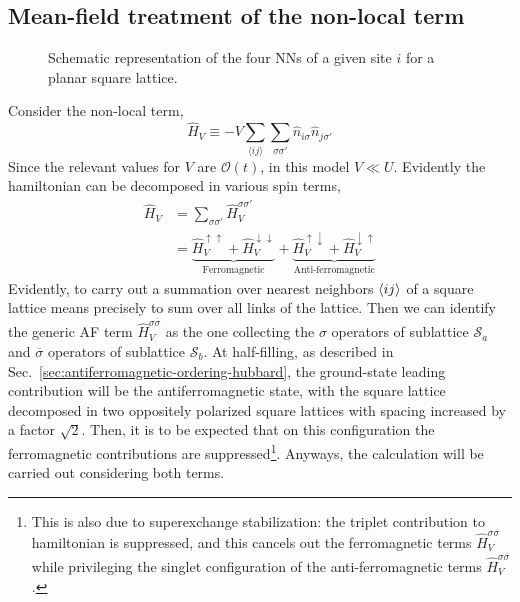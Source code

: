 \subsection{Mean-field treatment of the non-local term}

\begin{figure}
	\centering
	
	\caption{Schematic representation of the four NNs of a given site $i$ for a planar square lattice.}
	\label{fig:square-nearest-neighbors}
\end{figure}

Consider the non-local term,
\begin{equation}\label{eq:extended-hubbard-nonlocal-interaction}
	\hat H_V \equiv - V \sum_{\langle ij \rangle} \sum_{\sigma \sigma'} \hat n_{i\sigma} \hat n_{j\sigma'}
\end{equation}
{\color{tabred}Since the relevant values for $V$ are $\mathcal{O}(t)$, in this model $V \ll U$.} Evidently the hamiltonian can be decomposed in various spin terms,
\[
\begin{aligned}
	\hat H_V &= \sum_{\sigma \sigma'} \hat H_V^{\sigma\sigma'} \\
	&= \underbrace{
		\hat H_V^{\uparrow\uparrow} + \hat H_V^{\downarrow\downarrow}
	}_\text{Ferromagnetic} + \underbrace{
		\hat H_V^{\uparrow\downarrow} + \hat H_V^{\downarrow\uparrow}
	}_\text{Anti-ferromagnetic}
\end{aligned}
\]
Evidently, to carry out a summation over nearest neighbors $\ev{ij}$ of a square lattice means precisely to sum over all links of the lattice. Then we can identify the generic AF term $\hat H_V^{\sigma \overline{\sigma}}$ as the one collecting the $\sigma$ operators of sublattice $\mathcal{S}_a$ and $\overline{\sigma}$ operators of sublattice $\mathcal{S}_b$. At half-filling, as described in Sec.~\ref{sec:antiferromagnetic-ordering-hubbard}, the ground-state leading contribution will be the antiferromagnetic state, with the square lattice decomposed in two oppositely polarized square lattices with spacing increased by a factor $\sqrt{2}$. Then, it is to be expected that on this configuration the ferromagnetic contributions are suppressed\footnote{
	This is also due to superexchange stabilization: the triplet contribution to hamiltonian is suppressed, and this cancels out the ferromagnetic terms $\hat H_V^{\sigma\sigma}$ while privileging the singlet configuration of the anti-ferromagnetic terms $\hat H_V^{\sigma\overline{\sigma}}$.
}. Anyways, the calculation will be carried out considering both terms.
